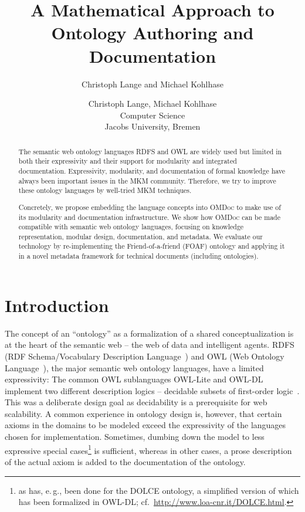 \documentclass{llncs}
\renewcommand{\omdoc}{\textsc{OMDoc}\xspace}
\begin{document}
\title{A Mathematical Approach to Ontology Authoring and Documentation}
\ifpublic
\author{Christoph Lange and Michael Kohlhase}
\else
\author{Christoph Lange, Michael Kohlhase\\
Computer Science\\
Jacobs University, Bremen}
\fi

\maketitle
\begin{abstract}
  The semantic web ontology languages RDFS and OWL are widely used but limited
  in both their expressivity and their support for modularity and integrated
  documentation.  Expressivity, modularity, and documentation of formal
  knowledge have always been important issues in the MKM community.  Therefore,
  we try to improve these ontology languages by well-tried MKM techniques.

  Concretely, we propose embedding the language concepts into \omdoc to make use of its
  modularity and documentation infrastructure. We show how \omdoc can be made compatible
  with semantic web ontology languages, focusing on knowledge representation, modular
  design, documentation, and metadata.  We evaluate our technology by re-implementing the
  Friend-of-a-friend (FOAF) ontology and applying it in a novel metadata framework for
  technical documents (including ontologies).
\end{abstract}

\section{Introduction}\label{sec:intro}

The concept of an ``ontology'' as a formalization of a shared conceptualization
\ifpublic\else{}\fi is at the heart of the
semantic web -- the web of data and intelligent agents.  RDFS (RDF Schema/Vocabulary
Description Language~\cite{BrGu04:rdfs}) and OWL (Web Ontology
Language~\cite{McGvHa:owl04}), the major semantic web ontology languages, have a limited
expressivity: The common OWL sublanguages OWL-Lite and OWL-DL implement two different
description logics -- decidable subsets of first-order logic~\cite{DL-handbook07}.  This
was a deliberate design goal as decidability is a prerequisite for web scalability.  A
common experience in ontology design is, however, that certain axioms in the domains to be
modeled exceed the expressivity of the languages chosen for implementation.  Sometimes,
dumbing down the model to less expressive special cases\footnote{as has, e.\,g., been done
  for the DOLCE ontology, a simplified version of which has been formalized in OWL-DL;
  cf.\ \url{http://www.loa-cnr.it/DOLCE.html}.} is sufficient, whereas in other cases, a
prose description of the actual axiom is added to the documentation of the ontology.
\end{document}
